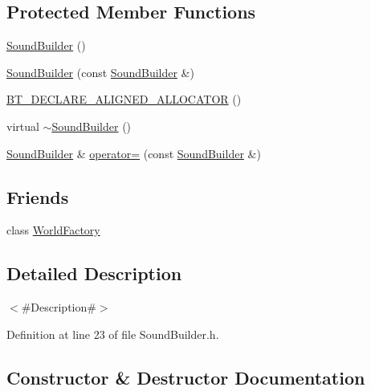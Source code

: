 \subsection*{Protected Member Functions}
\begin{DoxyCompactItemize}
\item 
\mbox{\hyperlink{classnjli_1_1_sound_builder_a8528324a8c0aaf4d7f92dcaf55529869}{Sound\+Builder}} ()
\item 
\mbox{\hyperlink{classnjli_1_1_sound_builder_a5a0fda44d88783ea23ff9149c1ceb5e2}{Sound\+Builder}} (const \mbox{\hyperlink{classnjli_1_1_sound_builder}{Sound\+Builder}} \&)
\item 
\mbox{\hyperlink{classnjli_1_1_sound_builder_a29c0f9da4d66868dc0c5e7ceb55cc78f}{B\+T\+\_\+\+D\+E\+C\+L\+A\+R\+E\+\_\+\+A\+L\+I\+G\+N\+E\+D\+\_\+\+A\+L\+L\+O\+C\+A\+T\+OR}} ()
\item 
virtual \mbox{\hyperlink{classnjli_1_1_sound_builder_a98b3aace77fe18026337d4cdd4882e45}{$\sim$\+Sound\+Builder}} ()
\item 
\mbox{\hyperlink{classnjli_1_1_sound_builder}{Sound\+Builder}} \& \mbox{\hyperlink{classnjli_1_1_sound_builder_aee21a4c3543eea9b267ce20d3dfe7dd3}{operator=}} (const \mbox{\hyperlink{classnjli_1_1_sound_builder}{Sound\+Builder}} \&)
\end{DoxyCompactItemize}
\subsection*{Friends}
\begin{DoxyCompactItemize}
\item 
class \mbox{\hyperlink{classnjli_1_1_sound_builder_acb96ebb09abe8f2a37a915a842babfac}{World\+Factory}}
\end{DoxyCompactItemize}


\subsection{Detailed Description}
$<$\#\+Description\#$>$ 

Definition at line 23 of file Sound\+Builder.\+h.



\subsection{Constructor \& Destructor Documentation}
\mbox{\label{classnjli_1_1_sound_builder_a8528324a8c0aaf4d7f92dcaf55529869}} 
